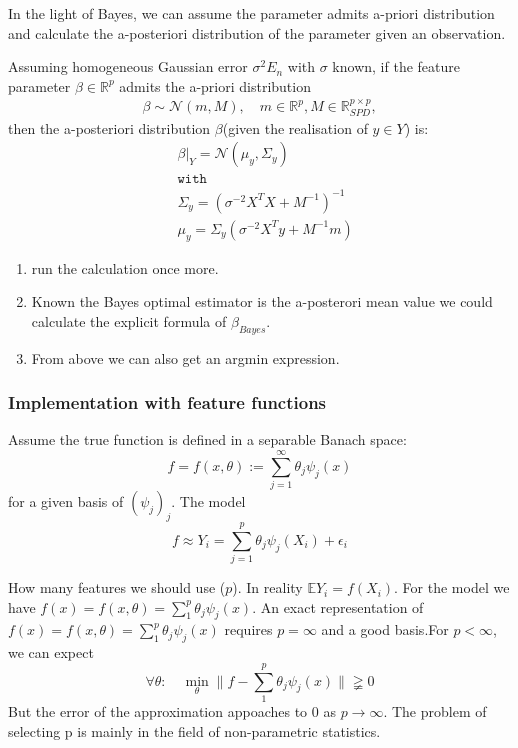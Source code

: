 In the light of Bayes, we can assume the parameter admits a-priori distribution and calculate the a-posteriori distribution of the parameter given an observation. 
\begin{theorem}
Assuming homogeneous Gaussian error $\sigma^2 E_n$ with $\sigma$ known, if the feature parameter $\beta \in \mathbb{R}^p$ admits the a-priori distribution
\begin{align*}
	\beta \sim \mathcal{N}(m, M), \quad m \in \mathbb{R}^p, M\in \mathbb{R}^{p \times p}_{SPD},
\end{align*} 
then the a-posteriori distribution $\beta$(given the realisation of $y \in Y$) is:
\begin{align*}
    &\beta|_Y = \mathcal{N}(\mu_{y}, \Sigma_{y})\\
    &\texttt{with}\\
    &\Sigma_{y} = (\sigma^{-2} X^T X + M^{-1})^{-1}\\
    &\mu_{y} = \Sigma_{y} (\sigma^{-2}X^T y + M^{-1} m)
\end{align*}
\end{theorem}
\begin{remark}\quad
\begin{enumerate}
    \item run the calculation once more.
    \item Known the Bayes optimal estimator is the a-posterori mean value we could calculate the explicit formula of $\beta_{Bayes}$.
    \item From above we can also get an argmin expression.
\end{enumerate}
\end{remark}


\subsubsection{Implementation with feature functions}
Assume the true function is defined in a separable Banach space:  
\begin{equation*}
	 f =  f(x, \theta) := \sum_{j = 1}^\infty \theta_j \psi_j(x)
\end{equation*}
for a given basis of $(\psi_j)_j$. The model
\begin{equation*}
	f \approx Y_i = \sum_{j = 1}^p \theta_j \psi_j(X_i) + \epsilon_i
\end{equation*}

\begin{remark}
	How many features we should use ($p$). In reality $\mathbb{E} Y_i = f(X_i)$. For the model we have $f(x) = f(x, \theta) = \sum_1^p \theta_j \psi_j(x)$. 
	An exact representation of $f(x) = f(x, \theta) = \sum_1^p \theta_j \psi_j(x)$ requires $p = \infty$ and a good basis.For $p < \infty$, we can expect 
	\begin{equation*}
		 \forall \theta: \quad \min_\theta \| f - \sum_1^p \theta_j \psi_j(x) \| \gneqq 0 
	\end{equation*}
	But the error of the approximation appoaches to 0 as $p \rightarrow \infty$. The problem of selecting p is mainly in the field of non-parametric statistics.
\end{remark}

